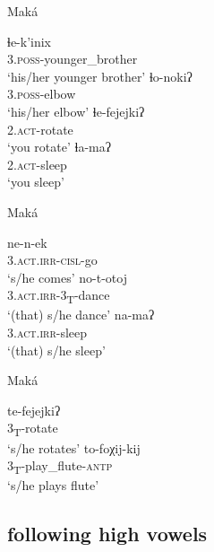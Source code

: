 \ea\label{ex-mk-lha-vh}
    Maká \citep[85, 88, 148]{AG94}
    \begin{xlist}
        \ex\gll ɬe-k’inix\\
                3.{\textsc{poss}}-younger\_brother\\
                \glt `his/her younger brother'
        \ex\gll ɬo-nokiʔ\\
                3.{\textsc{poss}}-elbow\\
                \glt `his/her elbow'
        \ex\gll ɬe-fejejkiʔ\\
                2.{\textsc{act}}-rotate\\
                \glt `you rotate'
        \ex\gll ɬa-maʔ\\
                2.{\textsc{act}}-sleep\\
                \glt `you sleep'
    \end{xlist}
\z

\ea\label{ex-mk-na-vh}
    Maká \citep[85, 88]{AG94}
    \begin{xlist}
        \ex\gll ne-n-ek\\
                3.{\textsc{act.irr-cisl}}-go\\
                \glt `s/he comes'
        \ex\gll no-t-otoj\\
                3.{\textsc{act.irr}}-3\textsubscript{T}-dance\\
                \glt `(that) s/he dance'
        \ex\gll na-maʔ\\
                3.{\textsc{act.irr}}-sleep\\
                \glt `(that) s/he sleep'
    \end{xlist}
\z

\ea\label{ex-mk-ta-vh}
    Maká \citep[106]{AG-BG03}
    \begin{xlist}
        \ex\gll te-fejejkiʔ\\
                3\textsubscript{T}-rotate\\
                \glt `s/he rotates'
        \ex\gll to-foχij-kij\\
                3\textsubscript{T}-play\_flute-{\textsc{antp}}\\
                \glt `s/he plays flute'
    \end{xlist}
\z

\subsection{ following high vowels}

